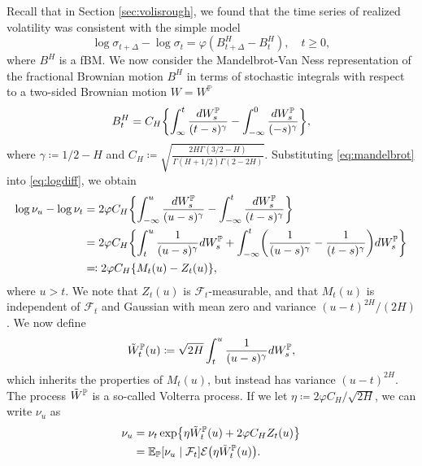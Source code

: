 Recall that in Section \ref{sec:volisrough}, we found that the time series of realized volatility was consistent with the simple model
\begin{equation}\label{eq:logdiff}
    \log \sigma_{t+\Delta} - \log\sigma_{t}=\varphi(B^{H}_{t+\Delta}-B^{H}_{t}),\quad t\geq 0,
\end{equation}
where $B^{H}$ is a fBM. We now consider the Mandelbrot-Van Ness representation of the fractional Brownian motion $B^H$ in terms of stochastic integrals with respect to a two-sided Brownian motion $W=W^{\mathbb{P}}$
\begin{equation}\label{eq:mandelbrot}
    B^{H}_{t}=C_{H}\left\{\int_{\infty}^{t}\frac{dW_{s}^{\p}}{(t-s)^{\gamma}} -\int_{-\infty}^{0}\frac{dW_{s}^{\p}}{(-s)^{\gamma}} \right\},
\end{equation}
where $\gamma\coloneqq 1/2-H$ and $C_{H}\coloneqq\sqrt{\frac{2H\Gamma(3/2-H)}{\Gamma(H+1/2)\Gamma(2-2H)}}$. \cite{mandelbrot} Substituting \eqref{eq:mandelbrot} into \eqref{eq:logdiff}, we obtain%
\begin{align}
    \log\nu_{u} - \log\nu_{t}&=2\varphi C_{H}\left\{\int_{-\infty}^{u}\frac{dW_{s}^{\p}}{(u-s)^{\gamma}} - \int_{-\infty}^{t}\frac{dW_{s}^{\p}}{(t-s)^{\gamma}}\right\}\\
    &= 2\varphi C_{H}\left\{\int_{t}^{u}\frac{1}{(u-s)^{\gamma}}dW_{s}^{\p} + \int_{-\infty}^{t}\left(\frac{1}{(u-s)^{\gamma}} - \frac{1}{(t-s)^{\gamma}}\right)dW_{s}^{\p} \right\}\\
    &\eqqcolon 2\varphi C_{H}\left\{M_{t}(u) - Z_{t}(u)\right\},
\end{align}
where $u>t$. We note that $Z_{t}(u)$ is $\mathcal{F}_{t}$-measurable, and that $M_{t}(u)$ is independent of $\mathcal{F}_{t}$ and Gaussian with mean zero and variance $(u-t)^{2H}/(2H)$. We now define
\begin{equation}\label{eq:volttera}
    \Tilde{W}_{t}^{\mathbb{P}}(u)\coloneqq \sqrt{2H}\int_{t}^{u}\frac{1}{(u-s)^{\gamma}}dW_{s}^{\mathbb{P}},
\end{equation}
which inherits the properties of $M_{t}(u)$, but instead has variance $(u-t)^{2H}$. The process $\Tilde{W}^{\mathbb{P}}$ is a so-called Volterra process. If we let $\eta \coloneqq 2\varphi C_{H}/\sqrt{2H}$, we can write $\nu_{u}$ as
\begin{align}
    \nu_{u}&=\nu_{t}\exp\left\{\eta\Tilde{W}^{\p}_{t}(u) + 2\varphi C_{H}Z_{t}(u) \right\} \\
    &= \E_{\p}[\nu_{u}\mid \mathcal{F}_{t}]\mathcal{E}\left(\eta \Tilde{W}^{\p}_{t}(u)\right).\label{eq:roulade}
\end{align}
